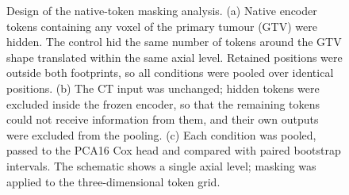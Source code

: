 \begin{figure}[!htbp]
\caption{Design of the native-token masking analysis. (a) Native encoder tokens containing any voxel of the primary tumour (GTV) were hidden. The control hid the same number of tokens around the GTV shape translated within the same axial level. Retained positions were outside both footprints, so all conditions were pooled over identical positions. (b) The CT input was unchanged; hidden tokens were excluded inside the frozen encoder, so that the remaining tokens could not receive information from them, and their own outputs were excluded from the pooling. (c) Each condition was pooled, passed to the PCA16 Cox head and compared with paired bootstrap intervals. The schematic shows a single axial level; masking was applied to the three-dimensional token grid.}
\label{fig:masking}
\end{figure}
